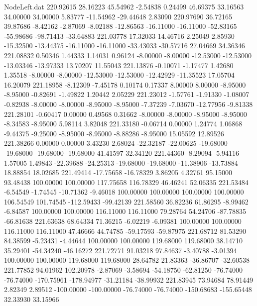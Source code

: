 \begin{filecontents}{NodeLeft.dat}
 220.92615   28.16223   45.54962    -2.54838    0.24499   46.69375   33.16563   34.00000   34.00000    5.83777  -11.54962  -29.44648    2.83090
 220.97690   36.72165   39.87686    -8.42162   -2.87069   -8.02188  -12.86563  -16.11000  -16.11000  -52.83165  -55.98686  -98.71413  -33.64883
 221.03778   17.32033   14.46716     2.25049    2.85930  -15.32500  -13.44375  -16.11000  -16.11000  -33.43033  -30.57716   27.04669   34.36346
 221.08832    0.50346    1.44333     1.14031    0.96124   -8.00000   -8.00000  -12.53000  -12.53000  -13.03346  -13.97333   13.70207   11.55043
 221.13876   -0.10071   -1.17477     1.42680    1.35518   -8.00000   -8.00000  -12.53000  -12.53000  -12.42929  -11.35523   17.05704   16.20079
 221.18958   -8.12309   -7.45178     0.10174    0.17337    8.00000    8.00000   -8.95000   -8.95000   -0.82691   -1.49822    1.20442    2.05229
 221.23012   -1.57761   -1.91330    -1.08007   -0.82938   -8.00000   -8.00000   -8.95000   -8.95000   -7.37239   -7.03670  -12.77956   -9.81338
 221.28101   -0.60417    0.00000     0.49568    0.31662   -8.00000   -8.00000   -8.95000   -8.95000   -8.34583   -8.95000    5.98114    3.82048
 221.33180   -0.06714    0.00000     1.24774    1.06868   -9.44375   -9.25000   -8.95000   -8.95000   -8.88286   -8.95000   15.05592   12.89526
 221.38266    0.00000    0.00000     3.43230    2.68024  -22.32187  -22.00625  -19.68000  -19.68000  -19.68000  -19.68000   41.41597   32.34120
 221.44360   -8.29094   -5.94116     1.57005    1.49843  -22.39688  -24.25313  -19.68000  -19.68000  -11.38906  -13.73884   18.88854   18.02685
 221.49414  -17.75658  -16.78329     3.86205    4.32761   95.15000   93.48438  100.00000  100.00000  117.75658  116.78329   46.46241   52.06335
 221.53484   -6.54549   -1.74545   -10.71362   -9.46018  100.00000  100.00000  100.00000  100.00000  106.54549  101.74545 -112.59433  -99.42139
 221.58560   36.82236   61.86295    -8.99462   -6.84587  100.00000  100.00000  116.11000  116.11000   79.28764   54.24706  -87.78835  -66.81638
 221.63638   68.64334   71.36215    -6.02219   -6.09381  100.00000  100.00000  116.11000  116.11000   47.46666   44.74785  -59.17593  -59.87975
 221.68712   81.53290   84.38599    -5.23431   -4.44644  100.00000  100.00000  119.68000  119.68000   38.14710   35.29401  -54.34240  -46.16272
 221.72771   91.03218   97.84637    -3.40788   -3.01394  100.00000  100.00000  119.68000  119.68000   28.64782   21.83363  -36.86707  -32.60538
 221.77852   94.01962  102.20978    -2.87069   -3.58694  -54.18750  -62.81250  -76.74000  -76.74000 -170.75961 -178.94977  -31.21184  -38.99932
 221.83945   73.94684   78.91449     2.82349    2.89512 -100.00000 -100.00000  -76.74000  -76.74000 -150.68683 -155.65448   32.33930   33.15966

\end{filecontents}
